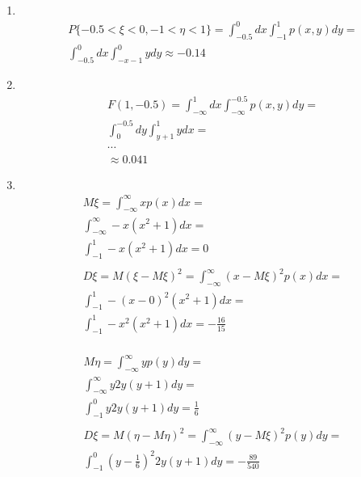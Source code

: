 \documentclass[12pt]{article}
\begin{document}
\begin{enumerate}
	\item \mbox{}\\
	      \begin{gather*}
		      P\{-0.5 < \xi < 0, -1 < \eta < 1\} = \int_{-0.5}^{0}dx\int_{-1}^{1}p(x,y)dy = \\
		      \int_{-0.5}^{0}dx\int_{-x-1}^{0}ydy \approx -0.14 %
	      \end{gather*}

	\item \mbox{}\\
	      \begin{gather*}
		      F(1,-0.5) = \int_{-\infty}^{1}dx\int_{-\infty}^{-0.5}p(x,y)dy = \\
		      \int_{0}^{-0.5}dy\int_{y+1}^{1}ydx = \\
		      \cdots \\
		      \approx 0.041
	      \end{gather*}

	\item \mbox{}\\
	      \begin{gather*}
		      M\xi = \int_{-\infty}^{\infty}xp(x)dx = \\
		      \int_{-\infty}^{\infty}-x(x^2 + 1)dx = \\
		      \int_{-1}^{1}-x(x^2+1)dx = 0 \\
		      \\
		      D\xi = M(\xi - M\xi)^2 = \int_{-\infty}^{\infty}(x - M\xi)^2p(x)dx = \\
		      \int_{-1}^{1}-(x - 0)^2(x^2 + 1)dx = \\
		      \int_{-1}^{1}-x^2(x^2+1)dx = -\frac{16}{15}\\
	      \end{gather*}

	      \begin{gather*}
		      M\eta = \int_{-\infty}^{\infty}yp(y)dy = \\
		      \int_{-\infty}^{\infty}y2y(y + 1)dy = \\
		      \int_{-1}^{0}y2y(y+1)dy = \frac{1}{6} \\
		      \\
		      D\xi = M(\eta - M\eta)^2 = \int_{-\infty}^{\infty}(y - M\xi)^2p(y)dy = \\
		      \int_{-1}^{0}(y - \frac{1}{6})^2 2y(y + 1) dy = -\frac{89}{540}
	      \end{gather*}


\end{enumerate}
\end{document}
